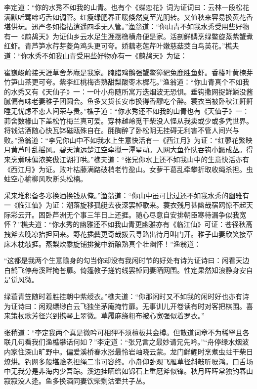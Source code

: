 \documentclass[12pt,UTF8]{ctexbook}
\begin{document}
{李定道：“你的水秀不如我的山青。也有个《蝶恋花》词为证词曰：云林一段松花满默听莺啼巧舌如调管。红瘦绿肥春正暖倏然夏至光阴转。又值秋来容易换黄花香堪供玩。迅严冬如指拈逍遥四季无人管。”渔翁道：“你山青不如我水秀受用些好物有一《鹧鸪天》为证仙乡云水足生涯摆橹横舟便是家。活剖鲜鳞烹绿鳖旋蒸紫蟹煮红虾。青芦笋水荇芽菱角鸡头更可夸。娇藕老莲芹叶嫩慈菇茭白鸟英花。”樵夫道：“你水秀不如我山青受用些好物亦有一《鹧鸪天》为证：

崔巍峻岭接天涯草舍茅庵是我家。腌腊鸡鹅强蟹鳖獐豝兔鹿胜鱼虾。香椿叶黄楝芽竹笋山茶更可夸。紫李红桃梅杏熟甜梨酸枣木樨花。”渔翁道：“你山青真个不如我的水秀又有《天仙子》一：一叶小舟随所寓万迭烟波无恐惧。垂钩撒网捉鲜鳞没酱腻偏有味老妻稚子团圆会。鱼多又货长安市换得香醪吃个醉。蓑衣当被卧秋江鼾鼾睡无忧虑不恋人间荣与贵。”樵子道：“你水秀还不如我的山青也有《天仙子》一：茆舍数椽山下盖松竹梅兰真可爱。穿林越岭觅干柴没人怪从我卖或少或多凭世界。将钱沽酒随心快瓦钵磁瓯殊自在。酕醄醉了卧松阴无挂碍无利害不管人间兴与败。”渔翁道：“李兄你山中不如我水上生意快活有一《西江月》为证：“红蓼花繁映月黄芦叶乱摇风。碧天清远楚江空牵搅一潭星动。入网大鱼作队吞钩小鳜成丛。得来烹煮味偏浓笑傲江湖打哄。”樵夫道：“张兄你水上还不如我山中的生意快活亦有《西江月》为证。败叶枯藤满路破梢老竹盈山。女萝干葛乱牵攀折取收绳杀担。虫蛀空心榆柳风吹断头松楠。

采来堆积备冬寒换酒换钱从俺。”渔翁道：“你山中虽可比过还不如我水秀的幽雅有一《临江仙》为证：潮落旋移孤艇去夜深罢棹歌来。蓑衣残月甚幽哉宿鸥惊不起天际彩云开。困卧芦洲无个事三竿日上还捱。随心尽意自安排朝臣寒待漏争似我宽怀？”樵夫道：“你水秀的幽雅还不如我山青更幽雅亦有《临江仙》可证：苍径秋高拽斧去晚凉抬担回来。野花插鬓更奇哉拨云寻路出待月叫门开。稚子山妻欣笑接草床木枕敧捱。蒸梨炊黍旋铺排瓮中新酿熟真个壮幽怀！”渔翁道：

“这都是我两个生意赡身的勾当你却没有我闲时节的好处有诗为证诗曰：闲看天边白鹤飞停舟溪畔掩苍扉。倚篷教子搓钓线罢棹同妻晒网围。性定果然知浪静身安自是觉风微。

绿蓑青笠随时着胜挂朝中紫绶衣。”樵夫道：“你那闲时又不如我的闲时好也亦有诗为证诗曰：闲观缥缈白云飞独坐茅庵掩竹扉。无事训儿开卷读有时对客把棋围。喜来策杖歌芳径兴到携琴上翠微。草履麻绦粗布被心宽强似着罗衣。”

张稍道：“李定我两个真是微吟可相狎不须檀板共金樽。但散道词章不为稀罕且各联几句看我们渔樵攀话何如？”李定道：“张兄言之最妙请兄先吟。”“舟停绿水烟波内家住深山旷野中。偏爱溪桥春水涨最怜岩岫晓云蒙。龙门鲜鲤时烹煮虫蛀干柴日燎烘。钓网多般堪赡老担绳二事可容终。小舟仰卧观飞雁草径斜敧听唳鸿。口舌场中无我分是非海内少吾踪。溪边挂晒缯如锦石上重磨斧似锋。秋月晖晖常独钓春山寂寂没人逢。鱼多换酒同妻饮柴剩沽壶共子丛。

}
\end{document}
